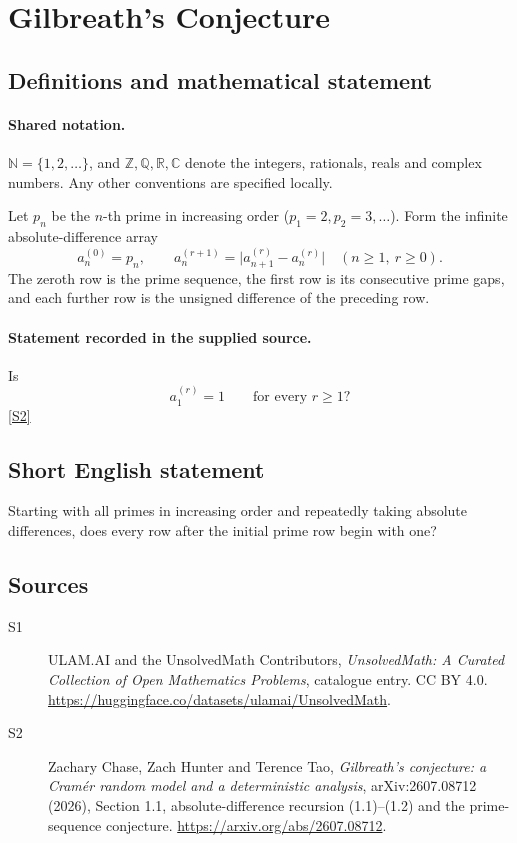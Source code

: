 \documentclass[11pt]{article}
\newcommand{\sref}[2]{\hyperlink{source:#1:#2}{[S#2]}}
\begin{document}
\section{Gilbreath's Conjecture}\label{statement}

\subsection{Definitions and mathematical statement}

\paragraph{Shared notation.}$\mathbb N=\{1,2,\ldots\}$, and $\mathbb Z,\mathbb Q,\mathbb R,\mathbb C$ denote the integers, rationals, reals and complex numbers. Any other conventions are specified locally.


Let \(p_n\) be the \(n\)-th prime in increasing order
(\(p_1=2,p_2=3,\ldots\)). Form the infinite absolute-difference array
\[
 a_n^{(0)}=p_n,\qquad
 a_n^{(r+1)}=\bigl|a_{n+1}^{(r)}-a_n^{(r)}\bigr|
                  \quad(n\ge1,\ r\ge0).
\]
The zeroth row is the prime sequence, the first row is its consecutive
prime gaps, and each further row is the unsigned difference of the preceding row.
\paragraph{Statement recorded in the supplied source.}
Is
\[
                         a_1^{(r)}=1\qquad\text{for every }r\ge1?
\] \sref{statement}{2}
\subsection{Short English statement}
Starting with all primes in increasing order and repeatedly taking absolute differences, does every row after the initial prime row begin with one?
\subsection{Sources}
\begin{description}
\item[\hypertarget{source:statement:1}{S1}] ULAM.AI and the UnsolvedMath Contributors, \emph{UnsolvedMath: A Curated Collection of Open Mathematics Problems}, catalogue entry. CC BY 4.0. \url{https://huggingface.co/datasets/ulamai/UnsolvedMath}.
\item[\hypertarget{source:statement:2}{S2}] Zachary Chase, Zach Hunter and Terence Tao, \emph{Gilbreath's conjecture: a Cram\'er random model and a deterministic analysis}, arXiv:2607.08712 (2026), Section 1.1, absolute-difference recursion (1.1)--(1.2) and the prime-sequence conjecture. \url{https://arxiv.org/abs/2607.08712}.
\end{description}
\label{end:statement}
\end{document}
